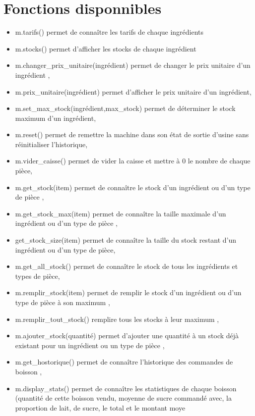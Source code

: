 \documentclass[]{article}
\begin{document}
\section*{Fonctions disponnibles}
\begin{itemize}
\itemsep1pt\parskip0pt
\item
  m.tarifs() permet de connaître les tarifs de chaque ingrédients
\item
  m.stocks() permet d'afficher les stocks de chaque ingrédient
\item
  m.changer\_prix\_unitaire(ingrédient) permet de changer le prix
  unitaire d'un ingrédient ,
\item
  m.prix\_unitaire(ingrédient) permet d'afficher le prix unitaire d'un
  ingrédient,
\item
  m.set\_max\_stock(ingrédient,max\_stock) permet de déterminer le stock
  maximum d'un ingrédient,
\item
  m.reset() permet de remettre la machine dans son état de sortie
  d'usine sans réinitialiser l'historique,
\item
  m.vider\_caisse() permet de vider la caisse et mettre à 0 le nombre de
  chaque pièce,
\item
  m.get\_stock(item) permet de connaître le stock d'un ingrédient ou
  d'un type de pièce ,
\item
  m.get\_stock\_max(item) permet de connaître la taille maximale d'un
  ingrédient ou d'un type de pièce ,
\item
  get\_stock\_size(item) permet de connaître la taille du stock restant
  d'un ingrédient ou d'un type de pièce,
\item
  m.get\_all\_stock() permet de connaître le stock de tous les
  ingrédients et types de pièce,
\item
  m.remplir\_stock(item) permet de remplir le stock d'un ingrédient ou
  d'un type de pièce à son maximum ,
\item
  m.remplir\_tout\_stock() remplire tous les stocks à leur maximum ,
\item
  m.ajouter\_stock(quantité) permet d'ajouter une quantité à un stock
  déjà existant pour un ingrédient ou un type de pièce ,
\item
  m.get\_hostorique() permet de connaître l'historique des commandes de
  boisson ,
\item
  m.display\_stats() permet de connaître les statistiques de chaque
  boisson (quantité de cette boisson vendu, moyenne de sucre commandé
  avec, la proportion de lait, de sucre, le total et le montant moye

\end{itemize}
\end{document}
